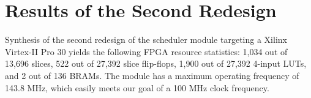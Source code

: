 \section{Results of the Second Redesign}
\label{sec:results2}

Synthesis of the second redesign of the scheduler module targeting a Xilinx
\cite{xilinx} Virtex-II Pro 30 yields the following FPGA resource statistics:
1,034 out of 13,696 slices, 522 out of 27,392 slice flip-flops, 1,900 out of
27,392 4-input LUTs, and 2 out of 136 BRAMs.  The module has a maximum
operating frequency of 143.8 MHz, which easily meets our goal of a 100 MHz
clock frequency.

